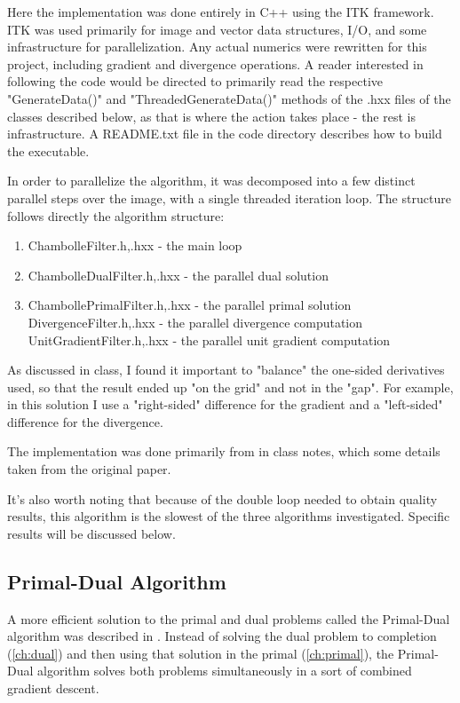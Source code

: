 \documentclass[11pt]{article}
\begin{document}
Here the implementation was done entirely in C++ using the ITK framework.
ITK was used primarily for image and vector data structures, I/O, and some infrastructure for parallelization.
Any actual numerics were rewritten for this project, including gradient and divergence operations.
A reader interested in following the code would be directed to primarily read the respective "GenerateData()" and "ThreadedGenerateData()" methods of the .hxx files of the classes described below, as that is where the action takes place - the rest is infrastructure. 
A README.txt file in the code directory describes how to build the executable.

In order to parallelize the algorithm, it was decomposed into a few distinct parallel steps over the image, with a single threaded iteration loop.  
The structure follows directly the algorithm structure:
\begin{enumerate}
\item
ChambolleFilter.h,.hxx - the main loop
\item
ChambolleDualFilter.h,.hxx - the parallel dual solution
\item
ChambollePrimalFilter.h,.hxx - the parallel primal solution \\
DivergenceFilter.h,.hxx - the parallel divergence computation \\
UnitGradientFilter.h,.hxx - the parallel unit gradient computation
\end{enumerate}

As discussed in class, I found it important to "balance" the one-sided derivatives used, so that the result ended up "on the grid" and not in the "gap".
For example, in this solution I use a "right-sided" difference for the gradient and a "left-sided" difference for the divergence.

The implementation was done primarily from in class notes, which some details taken from the original paper.

It's also worth noting that because of the double loop needed to obtain quality results, this algorithm is the slowest of the three algorithms investigated.
Specific results will be discussed below.

\subsection{Primal-Dual Algorithm}
A more efficient solution to the primal and dual problems called the Primal-Dual algorithm was described in \cite{zhu2008efficient}.
Instead of solving the dual problem to completion (\ref{ch:dual}) and then using that solution in the primal (\ref{ch:primal}), the Primal-Dual algorithm solves both problems simultaneously in a sort of combined gradient descent.
\end{document}
